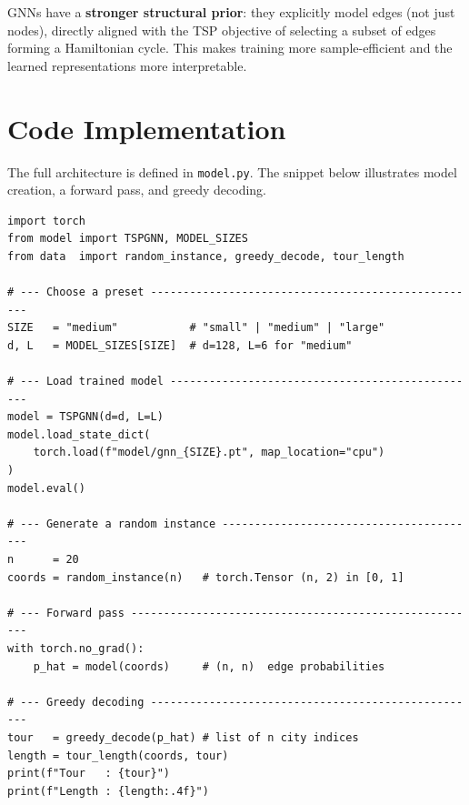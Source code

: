 \documentclass[12pt,a4paper]{article}
\begin{document}
GNNs have a \textbf{stronger structural prior}: they explicitly model edges
(not just nodes), directly aligned with the TSP objective of selecting a
subset of edges forming a Hamiltonian cycle.
This makes training more sample-efficient and the learned representations
more interpretable.

\section{Code Implementation}

The full architecture is defined in \texttt{model.py}.
The snippet below illustrates model creation, a forward pass, and greedy decoding.

\begin{lstlisting}[style=pythonstyle,
  caption={Creation, inference, and decoding
           (\texttt{model.py} + \texttt{data.py})}]
import torch
from model import TSPGNN, MODEL_SIZES
from data  import random_instance, greedy_decode, tour_length

# --- Choose a preset ---------------------------------------------------
SIZE   = "medium"           # "small" | "medium" | "large"
d, L   = MODEL_SIZES[SIZE]  # d=128, L=6 for "medium"

# --- Load trained model ------------------------------------------------
model = TSPGNN(d=d, L=L)
model.load_state_dict(
    torch.load(f"model/gnn_{SIZE}.pt", map_location="cpu")
)
model.eval()

# --- Generate a random instance ----------------------------------------
n      = 20
coords = random_instance(n)   # torch.Tensor (n, 2) in [0, 1]

# --- Forward pass ------------------------------------------------------
with torch.no_grad():
    p_hat = model(coords)     # (n, n)  edge probabilities

# --- Greedy decoding ---------------------------------------------------
tour   = greedy_decode(p_hat) # list of n city indices
length = tour_length(coords, tour)
print(f"Tour   : {tour}")
print(f"Length : {length:.4f}")
\end{lstlisting}
\end{document}
